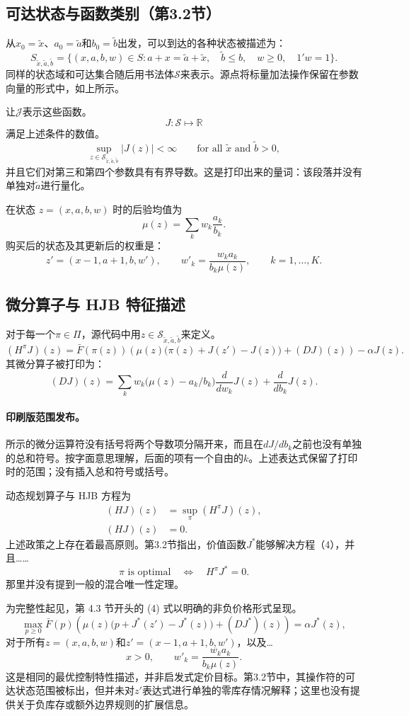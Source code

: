 \documentclass{article}
\begin{document}
\subsection*{可达状态与函数类别（第3.2节）}
从\(x_0=\tilde x\)、\(a_0=\tilde a\)和\(b_0=\tilde b\)出发，可以到达的各种状态被描述为：
\[
S_{\tilde x,\tilde a,\tilde b}
=\{(x,a,b,w)\in S:
 a+x=\tilde a+\tilde x,\quad
 \tilde b\leq b,\quad w\geq0,\quad 1'w=1\}.
\]
同样的状态域和可达集合随后用书法体\(\mathcal S\)来表示。源点将标量加法操作保留在参数向量的形式中，如上所示。

让\(\mathcal J\)表示这些函数。
\[
J:\mathcal S\longmapsto\mathbb R
\]
满足上述条件的数值。
\[
\sup_{z\in\mathcal S_{\tilde x,\tilde a,\tilde b}}|J(z)|<\infty
\qquad\text{for all }\tilde x\text{ and }\tilde b>0,
\]
并且它们对第三和第四个参数具有有界导数。这是打印出来的量词：该段落并没有单独对\(\tilde a\)进行量化。

在状态 \(z=(x,a,b,w)\) 时的后验均值为
\[
\mu(z)=\sum_k w_k\frac{a_k}{b_k}.
\]
购买后的状态及其更新后的权重是：
\[
z'=(x-1,a+1,b,w'),
\qquad
w'_k=\frac{w_ka_k}{b_k\mu(z)},\qquad k=1,\ldots,K.
\]

\subsection*{微分算子与 HJB 特征描述}
对于每一个\(\pi\in\Pi\)，源代码中用\(z\in\mathcal S_{\tilde x,\tilde a,\tilde b}\)来定义。
\[
(H^\pi J)(z)
=\bar F(\pi(z))\left(
\mu(z)\bigl(\pi(z)+J(z')-J(z)\bigr)+(DJ)(z)
\right)-\alpha J(z).
\]
其微分算子被打印为：
\[
(DJ)(z)=\sum_k w_k\bigl(\mu(z)-a_k/b_k\bigr)
\frac{d}{dw_k}J(z)+\frac{d}{db_k}J(z).
\]
\paragraph{印刷版范围发布。}
所示的微分运算符没有括号将两个导数项分隔开来，而且在\(dJ/db_k\)之前也没有单独的总和符号。按字面意思理解，后面的项有一个自由的\(k\)。上述表达式保留了打印时的范围；没有插入总和符号或括号。

动态规划算子与 HJB 方程为
\begin{align}
(HJ)(z)&=\sup_\pi(H^\pi J)(z),\tag{3}\\
(HJ)(z)&=0.\tag{4}
\end{align}
上述政策之上存在着最高原则。第3.2节指出，价值函数\(J^*\)能够解决方程（4），并且……
\[
\pi\text{ is optimal}\quad\Longleftrightarrow\quad H^\pi J^*=0.
\]
那里并没有提到一般的混合唯一性定理。

为完整性起见，第 4.3 节开头的 (4) 式以明确的非负价格形式呈现。
\[
\max_{p\geq0}\bar F(p)\left(
\mu(z)\bigl(p+J^*(z')-J^*(z)\bigr)+(DJ^*)(z)
\right)=\alpha J^*(z),
\]
对于所有\(z=(x,a,b,w)\)和\(z'=(x-1,a+1,b,w')\)，以及…
\[
x>0,\qquad w'_k=\frac{w_ka_k}{b_k\mu(z)}.
\]
这是相同的最优控制特性描述，并非启发式定价目标。第3.2节中，其操作符的可达状态范围被标出，但并未对\(z'\)表达式进行单独的零库存情况解释；这里也没有提供关于负库存或额外边界规则的扩展信息。
\end{document}
